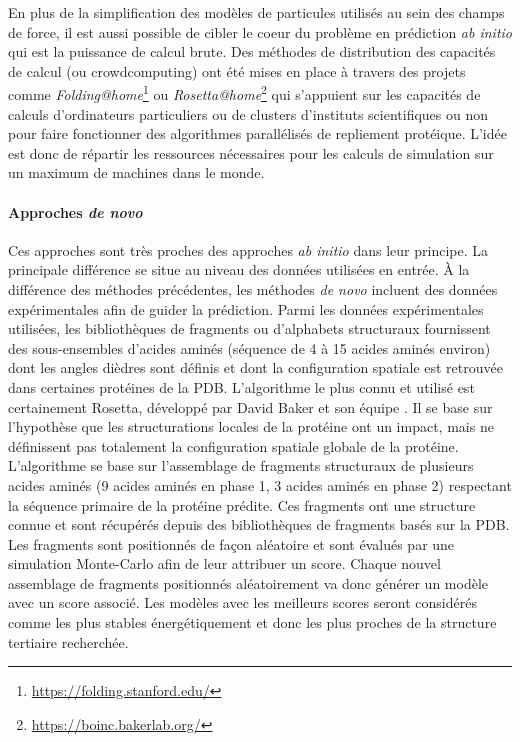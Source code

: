 En plus de la simplification des modèles de particules utilisés au sein des champs de force, il est aussi possible de cibler le coeur du problème en prédiction \textit{ab initio} qui est la puissance de calcul brute. Des méthodes de distribution des capacités de calcul (ou crowdcomputing) ont été mises en place à travers des projets comme \textit{Folding@home}\footnote{\url{https://folding.stanford.edu/}} ou \textit{Rosetta@home}\footnote{\url{https://boinc.bakerlab.org/}} qui s'appuient sur les capacités de calculs d'ordinateurs particuliers ou de clusters d'instituts scientifiques ou non pour faire fonctionner des algorithmes parallélisés de repliement protéique. L'idée est donc de répartir les ressources nécessaires pour les calculs de simulation sur un maximum de machines dans le monde.

\paragraph{Approches \textit{de novo}}

Ces approches sont très proches des approches \textit{ab initio} dans leur principe. La principale différence se situe au niveau des données utilisées en entrée. À la différence des méthodes précédentes, les méthodes \textit{de novo} incluent des données expérimentales afin de guider la prédiction. Parmi les données expérimentales utilisées, les bibliothèques de fragments ou d'alphabets structuraux fournissent des sous-ensembles d'acides aminés (séquence de 4 à 15 acides aminés environ) dont les angles dièdres sont définis et dont la configuration spatiale est retrouvée dans certaines protéines de la PDB. L'algorithme le plus connu et utilisé est certainement Rosetta, développé par David Baker et son équipe \cite{rohl2004protein}. Il se base sur l'hypothèse que les structurations locales de la protéine ont un impact, mais ne définissent pas totalement la configuration spatiale globale de la protéine. L'algorithme se base sur l'assemblage de fragments structuraux de plusieurs acides aminés (9 acides aminés en phase 1, 3 acides aminés en phase 2) respectant la séquence primaire de la protéine prédite. Ces fragments ont une structure connue et sont récupérés depuis des bibliothèques de fragments basés sur la PDB. Les fragments sont positionnés de façon aléatoire et sont évalués par une simulation Monte-Carlo afin de leur attribuer un score. Chaque nouvel assemblage de fragments positionnés aléatoirement va donc générer un modèle avec un score associé. Les modèles avec les meilleurs scores seront considérés comme les plus stables énergétiquement et donc les plus proches de la structure tertiaire recherchée.

